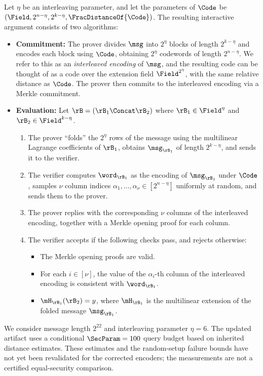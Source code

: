 Let $\eta$ be an interleaving parameter, and let the parameters of $\Code$ be $(\Field, 2^{n-\eta}, 2^{k-\eta}, \FracDistanceOf{\Code})$.
The resulting interactive argument consists of two algorithms:
\begin{itemize}
    \item \textbf{Commitment:} The prover divides $\msg$ into $2^{\eta}$ blocks of length $2^{k - \eta}$ and encodes each block using $\Code$, obtaining $2^{\eta}$ codewords of length $2^{n - \eta}$.
    We refer to this as an \emph{interleaved encoding} of $\msg$, and the resulting code can be thought of as a code over the extension field $\Field^{2^{\eta}}$, with the same relative distance as $\Code$.
    The prover then commits to the interleaved encoding via a Merkle commitment.
    \item \textbf{Evaluation:} Let $\rB = (\rB_1 \Concat \rB_2)$ where $\rB_1 \in \Field^{\eta}$ and $\rB_2 \in \Field^{k - \eta}$.
    \begin{enumerate}
        \item The prover ``folds'' the $2^{\eta}$ rows of the message using the multilinear Lagrange coefficients of $\rB_1$, obtains $\msg_{\rB_1}$ of length $2^{k - \eta}$, and sends it to the verifier.
        \item The verifier computes $\word_{\rB_1}$ as the encoding of $\msg_{\rB_1}$ under $\Code$, samples $\nu$ column indices $\alpha_1, \dots, \alpha_{\nu} \in [2^{n - \eta}]$ uniformly at random, and sends them to the prover.
        \item The prover replies with the corresponding $\nu$ columns of the interleaved encoding, together with a Merkle opening proof for each column.
        \item The verifier accepts if the following checks pass, and rejects otherwise:
        \begin{itemize}
            \item The Merkle opening proofs are valid.
            \item For each $i \in [\nu]$, the value of the $\alpha_i$-th column of the interleaved encoding is consistent with $\word_{\rB_1}$.
            \item $\mH_{\rB_1}(\rB_2) = y$, where $\mH_{\rB_1}$ is the multilinear extension of the folded message $\msg_{\rB_1}$.
        \end{itemize}
    \end{enumerate}
\end{itemize}

We consider message length $2^{22}$ and interleaving parameter $\eta = 6$.
The updated artifact uses a conditional $\SecParam = 100$ query budget based on inherited distance estimates.
These estimates and the random-setup failure bounds have not yet been revalidated for the corrected encoders; the measurements are not a certified equal-security comparison.


